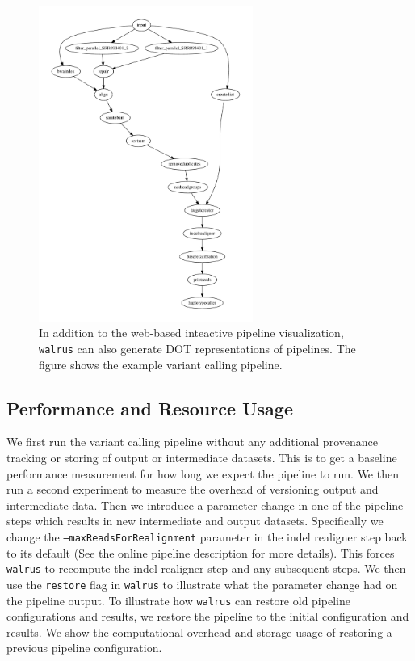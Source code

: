 \begin{figure}
\includegraphics[width=7cm]{figures/graph.pdf}
    \caption{In addition to the web-based inteactive pipeline visualization,
    \texttt{walrus} can also generate DOT representations of pipelines. The
    figure shows the example variant calling pipeline.} 
    \label{benchpipefigure}
\end{figure} 

\subsection{Performance and Resource Usage}
We first run the variant calling pipeline without any additional provenance
tracking or storing of output or intermediate datasets. This is to get a
baseline performance measurement for how long we expect the pipeline to run. We
then run a second experiment to measure the overhead of versioning output and
intermediate data. Then we introduce a parameter change in one of the pipeline
steps which results in new intermediate and output datasets. Specifically we
change the \texttt{--maxReadsForRealignment} parameter in the indel realigner
step back to its default (See the online pipeline description for more details).
This forces \texttt{walrus} to recompute the indel realigner step and any
subsequent steps. We then use the \texttt{restore} flag in \texttt{walrus} to
illustrate what the parameter change had on the pipeline output. To illustrate
how \texttt{walrus} can restore old pipeline configurations and results, we
restore the pipeline to the initial configuration and results. We show the
computational overhead and storage usage of restoring a previous pipeline
configuration. 

